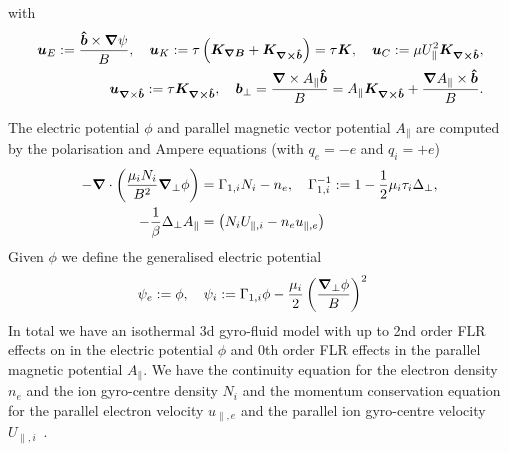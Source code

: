 with
\begin{align}
\vec u_E := \frac{\bhat\times\vn\psi}{B},\quad
\vec u_{K} := \tau \left(\vec{ K_{\vn B}} + \vec{ K_{\vn\times\bhat}}\right)=\tau\vec{ K}  ,\quad  %
\vec u_C := \mu U_\parallel^2\vec{ K_{\vn\times\bhat}},\nonumber\\
\vec u_{\vn\times\bhat} := \tau\vec{ K_{\vn\times\bhat}},\quad
{\vec b}_\perp = \frac{\vn\times A_\parallel \bhat}{B} = A_\parallel \vec{ K_{\vn\times\bhat}} + \frac{\vn A_\parallel \times \bhat}{B}.
\label{}
\end{align}

The electric potential \(\phi\) and parallel magnetic vector potential \(A_\parallel\) are
computed by the polarisation and Ampere equations (with $q_e=-e$ and $q_i=+e$)
\begin{align}
 -{\boldsymbol{\nabla}}\cdot\left(\frac{\mu_iN_i}{B^2} {\boldsymbol{\nabla}}_{\perp} \phi\right) &=  \Gamma_{1,i} N_i -n_e, \quad \Gamma_{1,i}^{-1} := 1-\frac{1}{2}\mu_i\tau_i\Delta_\perp , \\
  -\frac{1}{\beta} \Delta_\perp A_\parallel &= \left(N_i U_{\parallel,i}-n_e u_{\parallel,e} \right)
  \label{eq:polarisation_dimensional}
\end{align}
Given $\phi$ we define the generalised electric potential
\begin{align}
    \psi_e := \phi,\quad \psi_i&:= \Gamma_{1,i} \phi - \frac{\mu_i }{2}\left(\frac{{\boldsymbol{\nabla}}_{\perp}\phi}{B}\right)^2
\end{align}
In total
we have an isothermal 3d gyro-fluid model with up to 2nd order FLR effects
on in the electric potential $\phi$ and 0th order FLR effects in the parallel magnetic
potential $A_\parallel$.
We have the continuity equation for the electron density \(n_e\) and the ion gyro-centre
density \(N_i\) and the momentum conservation equation for
the parallel electron velocity \(u_{\parallel,e}\) and the parallel ion gyro-centre velocity \(U_{\parallel,i}\)~\cite{WiesenbergerPhD, HeldPhD}.
